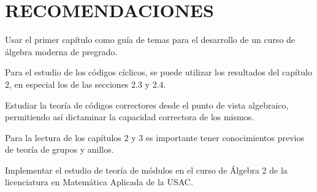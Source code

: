\chapter{RECOMENDACIONES}



\begin{finalList}

\item Usar el primer capítulo como guía de temas para el desarrollo de un curso de álgebra moderna de pregrado. 

\item Para el estudio de los códigos cíclicos, se puede utilizar los resultados del capítulo 2, en especial los de las secciones 2.3 y 2.4.

\item Estudiar la teoría de códigos correctores desde el punto de vista algebraico, permitiendo así dictaminar la capacidad correctora de los mismos.

\item Para la lectura de los capítulos 2 y 3 es importante tener conocimientos previos de teoría de grupos y anillos. 

\item Implementar el estudio de teoría de módulos en el curso de Álgebra 2 de la licenciatura en Matemática Aplicada de la USAC.
\end{finalList}
